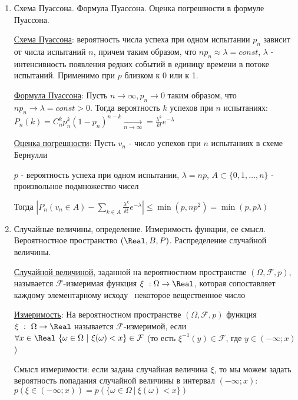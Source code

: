 \begin{enumerate}
    \item Схема Пуассона. Формула Пуассона. Оценка погрешности в формуле Пуассона.
    
    \hyperlink{poissonschema}{Схема Пуассона}: вероятность числа успеха при одном испытании $p_n$ зависит от числа испытаний $n$, причем таким образом, что $n p_n \approx \lambda = const$, 
    $\lambda$ - интенсивность появления редких событий в единицу времени в потоке испытаний. Применимо при $p$ близком к 0 или к 1.

    \hyperlink{poissonformula}{Формула Пуассона}: \Ths Пусть $n \to \infty, p_n \to 0$ таким образом, что $n p_n \to \lambda = const > 0$.
    Тогда вероятность $k$ успехов при $n$ испытаниях: $P_n(k) = C^k_n p_n^k (1 - p_n)^{n - k} \underset{n \to \infty}{\rightarrow} = \frac{\lambda^k}{k!} e^{-\lambda}$

    \hyperlink{errorinpoissonformula}{Оценка погрешности}: \Ths Пусть $v_n$ - число успехов при $n$ испытаниях в схеме Бернулли

    $p$ - вероятность успеха при одном испытании, $\lambda = np$, $A \subset \{0, 1, \dots, n\}$ - произвольное подмножество чисел

    Тогда $|P_n (v_n \in A) - \sum_{k \in A} \frac{\lambda^k}{k!} e^{-\lambda}| \leq \min (p, np^2) = \min (p, p\lambda)$

    \item Случайные величины, определение. Измеримость функции, ее смысл. Вероятностное пространство $(\Real, B, P)$. Распределение случайной величины.

    \hyperlink{randomvaluedefinition}{Случайной величиной}, заданной на вероятностном пространстве $(\Omega, \mathcal{F}, p)$, называется
    $\mathcal{F}$-измеримая функция $\xi \ : \Omega \to \Real$, которая сопоставляет каждому элементарному исходу \
    некоторое вещественное число

    \hyperlink{measurabilityoffunction}{Измеримость}: На вероятностном пространстве $(\Omega, \mathcal{F}, p)$ функция $\xi \ : \ \Omega \to \Real$ называется
    $\mathcal{F}$-измеримой, если $\forall x \in \Real \ \{\omega \in \Omega \ | \ \xi(\omega) < x\} \in \mathcal{F}$
    (то есть $\xi^{-1}(y) \in \mathcal{F}$, где $y \in (-\infty; x)$)

    Смысл измеримости: если задана случайная величина $\xi$, то мы можем задать вероятность попадания случайной
    величины в интервал $(-\infty; x)$: $p(\xi \in (-\infty; x)) = p(\{\omega \in \Omega \ | \ \xi(\omega) < x\})$


\end{enumerate}
